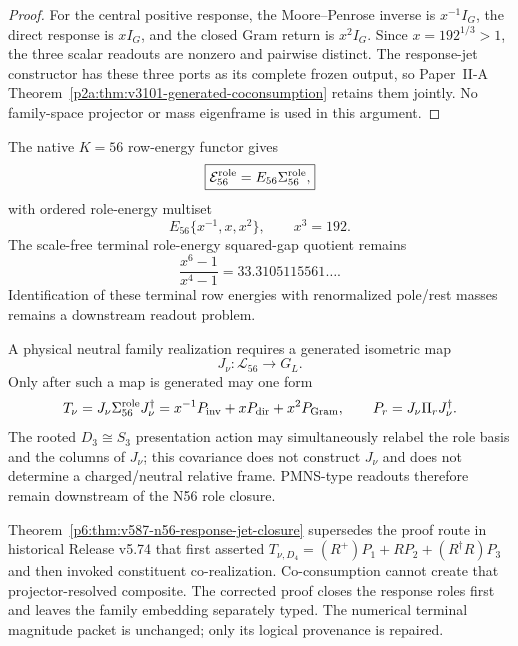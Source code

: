 \documentclass[12pt,a4paper]{article}
\begin{document}
\begin{proof}
For the central positive response, the Moore--Penrose inverse is
$x^{-1}I_G$, the direct response is $xI_G$, and the closed Gram return is
$x^2I_G$.  Since $x=192^{1/3}>1$, the three scalar readouts are nonzero and
pairwise distinct.  The response-jet constructor has these three ports as its
complete frozen output, so Paper~II-A
Theorem~\ref{p2a:thm:v3101-generated-coconsumption} retains them jointly.
No family-space projector or mass eigenframe is used in this argument.
\end{proof}

\begin{corollary}
\label{p6:cor:v587-terminal-role-energy-spectrum}
The native $K=56$ row-energy functor gives
\[
 \boxed{\mathcal E_{56}^{\rm role}=E_{56}\Sigma_{56}^{\rm role},}
\]
with ordered role-energy multiset
\[
 \boxed{E_{56}\{x^{-1},x,x^2\},\qquad x^3=192.}
\]
The scale-free terminal role-energy squared-gap quotient remains
\[
 \frac{x^6-1}{x^4-1}=33.3105115561\ldots .
\]
Identification of these terminal row energies with renormalized pole/rest
masses remains a downstream readout problem.
\end{corollary}

\begin{proposition}
\label{p6:prop:v587-family-embedding-firewall}
A physical neutral family realization requires a generated isometric map
\[
 J_\nu:\mathscr L_{56}\longrightarrow G_L.
\]
Only after such a map is generated may one form
\[
 T_\nu=J_\nu\Sigma_{56}^{\rm role}J_\nu^\dagger
 =x^{-1}P_{\rm inv}+xP_{\rm dir}+x^2P_{\rm Gram},
 \qquad P_r=J_\nu\Pi_rJ_\nu^\dagger.
\]
The rooted $D_3\cong S_3$ presentation action may simultaneously relabel the
role basis and the columns of $J_\nu$; this covariance does not construct
$J_\nu$ and does not determine a charged/neutral relative frame.  PMNS-type
readouts therefore remain downstream of the N56 role closure.
\end{proposition}

\begin{remark}
\label{p6:rem:v587-n56-supersession}
Theorem~\ref{p6:thm:v587-n56-response-jet-closure} supersedes the proof route
in historical Release v5.74 that first asserted
$T_{\nu,D_4}=(R^+)P_1+RP_2+(R^\dagger R)P_3$ and then invoked constituent
co-realization.  Co-consumption cannot create that projector-resolved
composite.  The corrected proof closes the response roles first and leaves the
family embedding separately typed.  The numerical terminal magnitude packet
is unchanged; only its logical provenance is repaired.
\end{remark}
\end{document}
